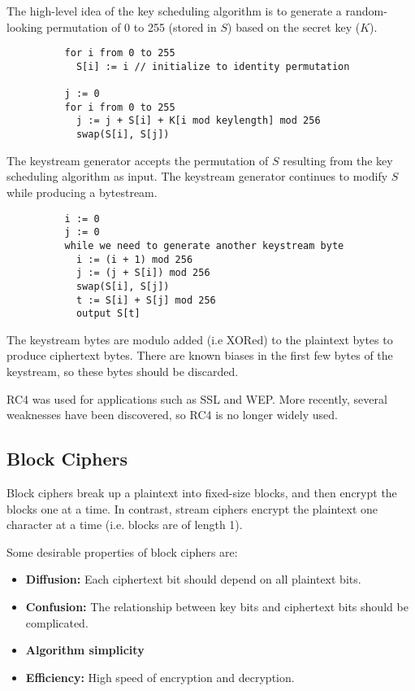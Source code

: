 \documentclass[12pt,titlepage]{article}
\begin{document}
        The high-level idea of the key scheduling algorithm is to generate a random-looking permutation of 0 to 255 (stored in $S$) based on the secret
        key ($K$).

        \begin{verbatim}
          for i from 0 to 255
            S[i] := i // initialize to identity permutation

          j := 0
          for i from 0 to 255
            j := j + S[i] + K[i mod keylength] mod 256
            swap(S[i], S[j])
        \end{verbatim}

        The keystream generator accepts the permutation of $S$ resulting from the key scheduling algorithm as input. The keystream generator continues to
        modify $S$ while producing a bytestream.

        \begin{verbatim}
          i := 0
          j := 0
          while we need to generate another keystream byte
            i := (i + 1) mod 256
            j := (j + S[i]) mod 256
            swap(S[i], S[j])
            t := S[i] + S[j] mod 256
            output S[t]
        \end{verbatim}

        The keystream bytes are modulo added (i.e XORed) to the plaintext bytes to produce ciphertext bytes. There are known biases in the first few bytes
        of the keystream, so these bytes should be discarded.

        RC4 was used for applications such as SSL and WEP. More recently, several weaknesses have been discovered, so RC4 is no longer widely used.

    \subsection{Block Ciphers}
      Block ciphers break up a plaintext into fixed-size blocks, and then encrypt the blocks one at a time. In contrast, stream ciphers encrypt the plaintext
      one character at a time (i.e. blocks are of length 1).

      Some desirable properties of block ciphers are:
      \begin{itemize}
        \item \textbf{Diffusion:} Each ciphertext bit should depend on all plaintext bits.
        \item \textbf{Confusion:} The relationship between key bits and ciphertext bits should be complicated.
        \item \textbf{Algorithm simplicity}
        \item \textbf{Efficiency:} High speed of encryption and decryption.
      \end{itemize}
\end{document}
